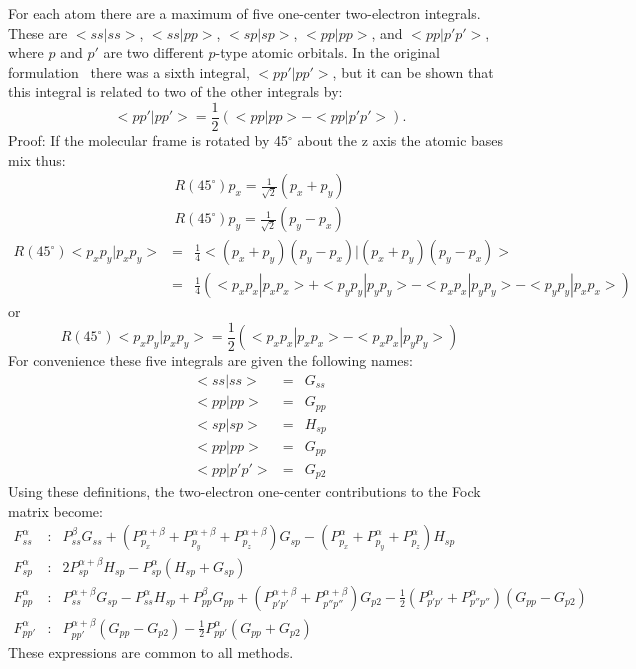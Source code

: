 For each atom there are a maximum of five one-center two-electron integrals.
These are $<\!ss|ss\!>$, $<\!ss|pp\!>$,  $<\!sp|sp\!>$, $<\!pp|pp\!>$, and
$<\!pp|p'p'\!>$, where $p$ and $p'$ are two different $p$-type atomic orbitals.
In the original formulation~\cite{dt4689} there was a sixth integral,
$<\!pp'|pp'\!>$, but it can be shown that this integral is related to two of
the other integrals by:
$$
  <pp'|pp'> = \frac{1}{2}(<pp|pp> - <pp|p'p'>).
$$
Proof:
If the molecular frame is rotated by 45$^\circ$ about
the z axis the atomic bases mix thus:
\begin{eqnarray}
   R(45^\circ)p_x = \frac{1}{\sqrt{2}}(p_x + p_y) \\ \nonumber
   R(45^\circ)p_y = \frac{1}{\sqrt{2}}(p_y - p_x) \nonumber
\end{eqnarray}
\begin{eqnarray}
 R(45^\circ)<p_xp_y|p_xp_y>& =& \frac{1}{4}<(p_x+p_y)(p_y-p_x)|(p_x+p_y)(p_y-p_x)> \nonumber \\
& =& \frac{1}{4}(<p_xp_x|p_xp_x> + <p_yp_y|p_yp_y> - <p_xp_x|p_yp_y> - <p_yp_y|p_xp_x>)\nonumber
\end{eqnarray}
or
$$
 R(45^\circ)<p_xp_y|p_xp_y> =\frac{1}{2}(<p_xp_x|p_xp_x> - <p_xp_x|p_yp_y>)
$$
 For convenience these five integrals are given the following names:
\begin{eqnarray}
    <ss|ss> &=& G_{ss} \nonumber  \\
    <pp|pp>&=&  G_{pp} \nonumber  \\
    <sp|sp>&=&  H_{sp} \nonumber  \\
    <pp|pp>&=&  G_{pp} \nonumber  \\
    <pp|p'p'>&=&  G_{p2}\nonumber
\end{eqnarray}
 Using these definitions, the two-electron one-center
contributions to the Fock matrix become:
\begin{eqnarray}
F_{ss}^{\alpha}&:&P_{ss}^{\beta}G_{ss}+(P_{p_x}^{\alpha+\beta}+P_{p_y}^{\alpha+\beta}+P_{p_z}^{\alpha+\beta})G_{sp}
-(P_{p_x}^{\alpha}+P_{p_y}^{\alpha}+P_{p_z}^{\alpha})H_{sp}\nonumber  \\
F_{sp}^{\alpha}&:&2P_{sp}^{\alpha+\beta}H_{sp}-P_{sp}^{\alpha}(H_{sp}+G_{sp})\nonumber  \\
F_{pp}^{\alpha}&:&P_{ss}^{\alpha+\beta}G_{sp}-P_{ss}^{\alpha}H_{sp}+
P_{pp}^{\beta}G_{pp} +(P_{p'p'}^{\alpha+\beta}+P_{p''p''}^{\alpha+\beta})G_{p2}
-\frac{1}{2}(P_{p'p'}^{\alpha}+P_{p''p''}^{\alpha})(G_{pp}-G_{p2})\nonumber  \\
F_{pp'}^{\alpha}&:&P_{pp'}^{\alpha+\beta}(G_{pp}-G_{p2})
-\frac{1}{2}P_{pp'}^{\alpha}(G_{pp}+G_{p2}) \nonumber
\end{eqnarray}
These expressions are common to all methods.

